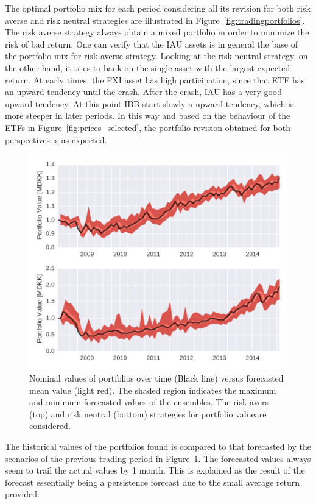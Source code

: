 The optimal portfolio mix for each period considering all its revision for both risk averse and risk neutral strategies are illustrated in Figure~\ref{fig:tradingportfolios}.
The risk averse strategy always obtain a mixed portfolio in order to minimize the risk of bad return.
One can verify that the IAU assets is in general the base of the portfolio mix for risk averse strategy.
Looking at the risk neutral strategy, on the other hand, it tries to bank on the single asset with the largest expected return.
At early times, the FXI asset has high participation, since that ETF has an upward tendency until the crash. After the crash, IAU has a very good upward tendency.
At this point IBB start slowly a upward tendency, which is more steeper in later periods.
In this way and based on the behaviour of the ETFs in Figure~\ref{fig:prices_selected}, the portfolio revision obtained for both perspectives is as expected.

\begin{figure}[tpb]
\centering
\includegraphics{../pic/trading_forecasted_value.pdf}
\caption{Nominal values of portfolios over time (Black line) versus forecasted mean value (light red). The shaded region indicates the maximum and minimum forecasted values of the ensembles. The risk avers (top) and risk neutral (bottom) strategies for portfolio valueare considered.}
\label{fig:tradingforecastedvalues}
\end{figure}

The historical values of the portfolios found is compared to that forecasted by the scenarios of the previous trading period in Figure~\ref{fig:tradingforecastedvalues}.
The forecasted values always seem to trail the actual values by 1 month.
This is explained as the result of the forecast essentially being a persistence forecast due to the small average return provided.


